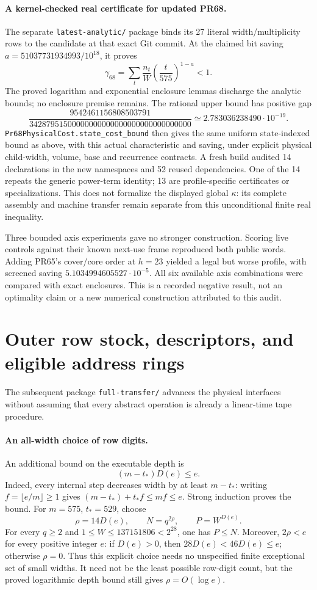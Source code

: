 \documentclass[11pt]{article}
\begin{document}
\paragraph{A kernel-checked real certificate for updated PR68.}
The separate \texttt{latest-analytic/} package binds its 27 literal
width/multiplicity rows to the candidate at that exact Git commit.
At the claimed bit saving $a=51037731934993/10^{18}$, it proves
\[
 \gamma_{68}=\sum_t\frac{n_t}{W}
       \left(\frac{t}{575}\right)^{1-a}<1.
\]
The proved logarithm and exponential enclosure lemmas discharge the
analytic bounds; no enclosure premise remains. The rational upper bound
has positive gap
\[
 \frac{9542461156808503791}
 {34287951500000000000000000000000000000}
 \mathrel{\simeq}2.783036238490\cdot10^{-19}.
\]
\texttt{Pr68PhysicalCost.state\_cost\_bound} then gives the same uniform
state-indexed bound as above, with this actual characteristic and saving,
under explicit physical child-width, volume, base and recurrence contracts.
A fresh build audited 14 declarations in the new namespaces and 52 reused
dependencies. One of the 14 repeats the generic power-term identity;
13 are profile-specific certificates or specializations. This does not
formalize the displayed global $\kappa$: its complete assembly and machine
transfer remain separate from this unconditional finite real inequality.

Three bounded axis experiments gave no stronger construction. Scoring
live controls against their known next-use frame reproduced both public
words. Adding PR65's cover/core order at $h=23$ yielded a legal but
worse profile, with screened saving $5.1034994605527\cdot10^{-5}$.
All six available axis combinations were compared with exact enclosures.
This is a recorded negative result, not an optimality claim or a new
numerical construction attributed to this audit.

\section{Outer row stock, descriptors, and eligible address rings}
The subsequent package \texttt{full-transfer/} advances the physical
interfaces without assuming that every abstract operation is already a
linear-time tape procedure.

\paragraph{An all-width choice of row digits.}
An additional bound on the executable depth is
\[
 (m-t_*)D(e)\le e.
\]
Indeed, every internal step decreases width by at least $m-t_*$:
writing $f=\lfloor e/m\rfloor\ge1$ gives
$(m-t_*)+t_*f\le mf\le e$. Strong induction proves the bound.
For $m=575$, $t_*=529$, choose
\[
 \rho=14D(e),\qquad N=q^{2\rho},\qquad P=W^{D(e)}.
\]
For every $q\ge2$ and $1\le W\le137151806<2^{28}$, one has
$P\le N$. Moreover, $2\rho<e$ for every positive integer $e$:
if $D(e)>0$, then $28D(e)<46D(e)\le e$; otherwise $\rho=0$.
Thus this explicit choice needs no unspecified finite exceptional set of
small widths. It need not be the least possible row-digit count, but the
proved logarithmic depth bound still gives $\rho=O(\log e)$.
\end{document}
